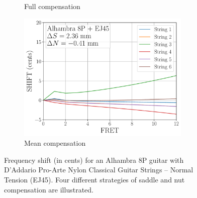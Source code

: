 \begin{figure}
\begin{subfigure}[b]{0.45\textwidth}
   \caption{Full compensation}
   \label{fig:shift_alhambra8p_ej45_full}
  \end{subfigure}
  \hspace{0.25in}
  \begin{subfigure}[b]{0.45\textwidth}
   \centering
   \includegraphics[width=3.25in]{figures/shift_alhambra8p_ej45_mean}
   \caption{Mean compensation}
   \label{fig:shift_alhambra8p_ej45_mean}
  \end{subfigure}
  \caption{\label{fig:compensation_alhambra8p_ej45} Frequency shift (in cents) for an Alhambra 8P guitar with D'Addario Pro-Arte Nylon Classical Guitar Strings -- Normal Tension (EJ45). Four different strategies of saddle and nut compensation are illustrated.}
 \end{figure}

